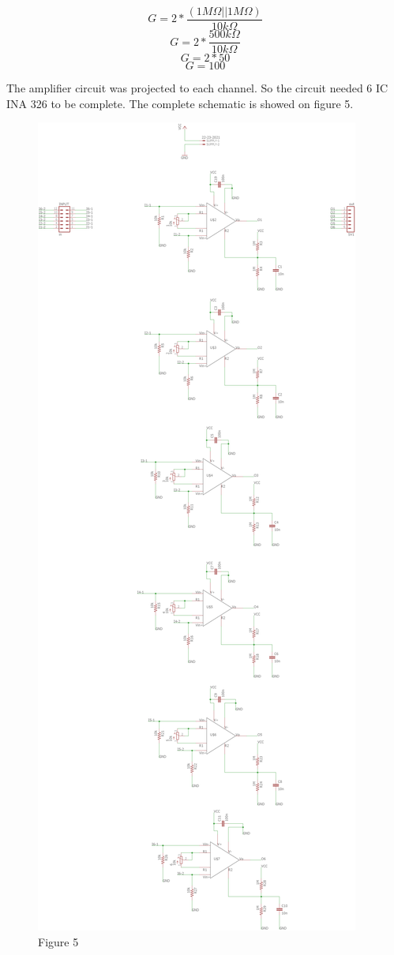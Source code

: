$$G=2*\frac{(1M\Omega||1M\Omega)}{10k\Omega}$$
$$G=2*\frac{500k\Omega}{10k\Omega}$$
$$G=2*50$$
$$G=100$$

The amplifier circuit was projected to each channel. So the circuit needed 6 IC INA 326 to be complete. The complete schematic is showed on figure 5.

\begin{figure}[!htpb]
\centering
\includegraphics[scale=0.45]{textual-elements/hardware/INAsch}
\caption{Figure 5}
\end{figure}